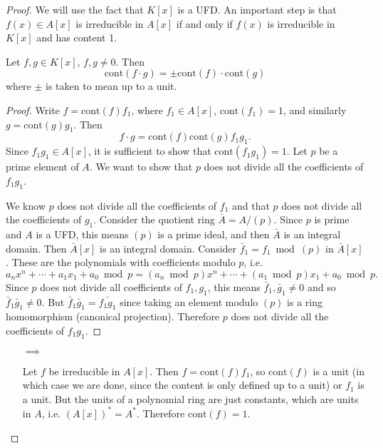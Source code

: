 \begin{proof}
We will use the fact that $K[x]$ is a UFD. An important step is that
$f(x) \in A[x]$ is irreducible in $A[x]$ if and only if $f(x)$ is
irreducible in $K[x]$ and has content 1.

\begin{lemma}
Let $f, g \in K[x]$, $f, g \neq 0$. Then
$$
\mathrm{cont}(f \cdot g) = \pm \mathrm{cont}(f) \cdot \mathrm{cont}(g)
$$
where $\pm$ is taken to mean up to a unit.
\end{lemma}
\begin{proof}
Write $f = \mathrm{cont}(f) f_1$, where $f_1 \in A[x]$,
$\mathrm{cont}(f_1) = 1$, and similarly $g = \mathrm{cont}(g) g_1$.
Then
$$
f \cdot g = \mathrm{cont}(f) \mathrm{cont}(g) f_1 g_1.
$$
Since $f_1 g_1 \in A[x]$, it is sufficient to show that
$\mathrm{cont}(f_1 g_1) = 1$. Let $p$ be a prime element of $A$. We
want to show that $p$ does not divide all the coefficients of $f_1
g_1$.

We know $p$ does not divide all the coefficients of $f_1$ and that $p$
does not divide all the coefficients of $g_1$. Consider the quotient
ring $\bar{A} = A / (p)$. Since $p$ is prime and $A$ is a UFD, this
means $(p)$ is a prime ideal, and then $\bar{A}$ is an integral
domain. Then $\bar{A}[x]$ is an integral domain.
Consider $\bar{f}_1 = f_1 \bmod (p)$ in $\bar{A}[x]$. These are the
polynomials with coefficients modulo $p$, i.e.
$$
  a_n x^n + \cdots + a_1 x_1 + a_0 \bmod p
= (a_n \bmod p) x^n + \cdots + (a_1 \bmod p) x_1 + a_0 \bmod p.
$$
Since $p$ does not divide all coefficients of $f_1, g_1$, this means
$\bar{f}_1, \bar{g}_1 \neq 0$ and so $\bar{f}_1 \bar{g}_1  \neq 0$.
But $\bar{f}_1 \bar{g}_1 = \bar{f_1g_1}$ since taking an element
modulo $(p)$ is a ring homomorphism (canonical projection).
Therefore $p$ does not divide all the coefficients of $f_1 g_1$.
\end{proof}

\begin{itemize}
  \item[$\implies$]{
    Let $f$ be irreducible in $A[x]$. Then
    $f = \mathrm{cont}(f) f_1$, so $\mathrm{cont}(f)$ is a unit (in which
    case we are done, since the content is only defined up to a unit)
    or $f_1$ is a unit. But the units of a polynomial ring are just
    constants, which are units in $A$, i.e. $(A[x])^\ast =
    A^\ast$. Therefore $\mathrm{cont}(f) = 1$.

}
\end{itemize}
\end{proof}
